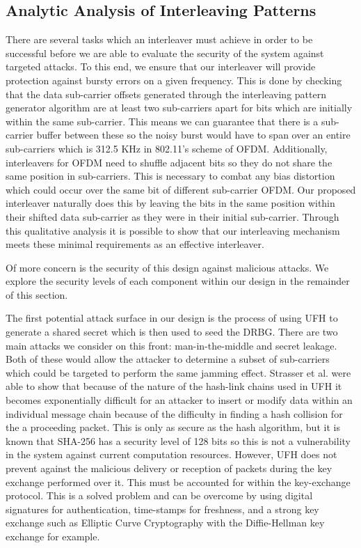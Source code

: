 \documentclass[sigconf]{acmart}
\begin{document}
\subsection{Analytic Analysis of Interleaving Patterns}
\label{sub:analyticAnalysis}

There are several tasks which an interleaver must achieve in order to be successful before we are able to evaluate the security of the system against targeted attacks. To this end, we ensure that our interleaver will provide protection against bursty errors on a given frequency. This is done by checking that the data sub-carrier offsets generated through the interleaving pattern generator algorithm are at least two sub-carriers apart for bits which are initially within the same sub-carrier. This means we can guarantee that there is a sub-carrier buffer between these so the noisy burst would have to span over an entire sub-carriers which is 312.5 KHz in 802.11's scheme of OFDM\cite{ieee80211}. Additionally, interleavers for OFDM need to shuffle adjacent bits so they do not share the same position in sub-carriers. This is necessary to combat any bias distortion which could occur over the same bit of different sub-carrier OFDM. Our proposed interleaver naturally does this by leaving the bits in the same position within their shifted data sub-carrier as they were in their initial sub-carrier. Through this qualitative analysis it is possible to show that our interleaving mechanism meets these minimal requirements as an effective interleaver.

Of more concern is the security of this design against malicious attacks. We explore the security levels of each component within our design in the remainder of this section.

The first potential attack surface in our design is the process of using UFH to generate a shared secret which is then used to seed the DRBG. There are two main attacks we consider on this front: man-in-the-middle and secret leakage. Both of these would allow the attacker to determine a subset of sub-carriers which could be targeted to perform the same jamming effect. Strasser et al. were able to show that because of the nature of the hash-link chains used in UFH it becomes exponentially difficult for an attacker to insert or modify data within an individual message chain because of the difficulty in finding a hash collision for the a proceeding packet\cite{strasser2008jamming}. This is only as secure as the hash algorithm, but it is known that SHA-256 has a security level of 128 bits so this is not a vulnerability in the system against current computation resources\cite{barker2016nist57}. However, UFH does not prevent against the malicious delivery or reception of packets during the key exchange performed over it. This must be accounted for within the key-exchange protocol. This is a solved problem and can be overcome by using digital signatures for authentication, time-stamps for freshness, and a strong key exchange such as Elliptic Curve Cryptography with the Diffie-Hellman key exchange for example\cite{canetti2001analysis, xie2017provably}.
\end{document}
